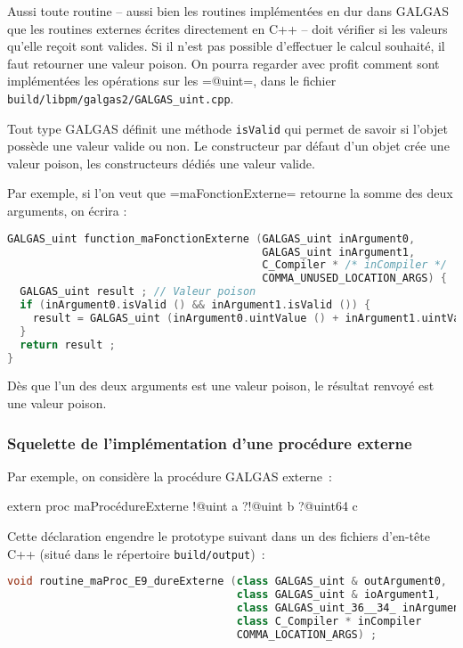 Aussi toute routine -- aussi bien les routines implémentées en dur dans GALGAS que les routines externes écrites directement en C++ -- doit vérifier si les valeurs qu'elle reçoit sont valides. Si il n'est pas possible d'effectuer le calcul souhaité, il faut retourner une valeur poison. On pourra regarder avec profit comment sont implémentées les opérations sur les \ggs=@uint=, dans le fichier \texttt{build/libpm/galgas2/GALGAS\_uint.cpp}.


Tout type GALGAS définit une méthode \texttt{isValid} qui permet de savoir si l'objet possède une valeur valide ou non. Le constructeur par défaut d'un objet crée une valeur poison, les constructeurs dédiés une valeur valide.

Par exemple, si l'on veut que \ggs=maFonctionExterne= retourne la somme des deux arguments, on écrira :

\begin{lstlisting}[language=C++]
GALGAS_uint function_maFonctionExterne (GALGAS_uint inArgument0,
                                        GALGAS_uint inArgument1,
                                        C_Compiler * /* inCompiler */
                                        COMMA_UNUSED_LOCATION_ARGS) {
  GALGAS_uint result ; // Valeur poison
  if (inArgument0.isValid () && inArgument1.isValid ()) {
    result = GALGAS_uint (inArgument0.uintValue () + inArgument1.uintValue ()) ;
  }
  return result ;
}
\end{lstlisting}

Dès que l'un des deux arguments est une valeur poison, le résultat renvoyé est une valeur poison.


\subsubsection{Squelette de l'implémentation d'une procédure externe}

Par exemple, on considère la procédure GALGAS externe~:
\begin{galgas}
extern proc maProcédureExterne !@uint a ?!@uint b ?@uint64 c
\end{galgas}

Cette déclaration engendre le prototype suivant dans un des fichiers d'en-tête C++ (situé dans le répertoire \texttt{build/output})~:
\begin{lstlisting}[language=C++]
void routine_maProc_E9_dureExterne (class GALGAS_uint & outArgument0,
                                    class GALGAS_uint & ioArgument1,
                                    class GALGAS_uint_36__34_ inArgument2,
                                    class C_Compiler * inCompiler
                                    COMMA_LOCATION_ARGS) ;
\end{lstlisting}

